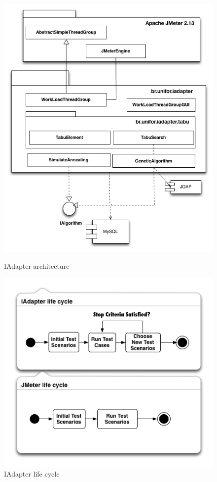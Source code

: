 \begin{figure}[h]
\begin{minipage}{.5\textwidth}
\center
\includegraphics[width=1\textwidth]{./images/iadapter1.png}
\caption{IAdapter architecture}
\label{fig:iadapterarchitecture}
\end{minipage}
\begin{minipage}{.5\textwidth}
\centering
\includegraphics[width=1\textwidth]{./images/lifecycle2.png}
\caption{IAdapter life cycle}
\label{fig:iadapterlifecycle}
\end{minipage}
\end{figure}

